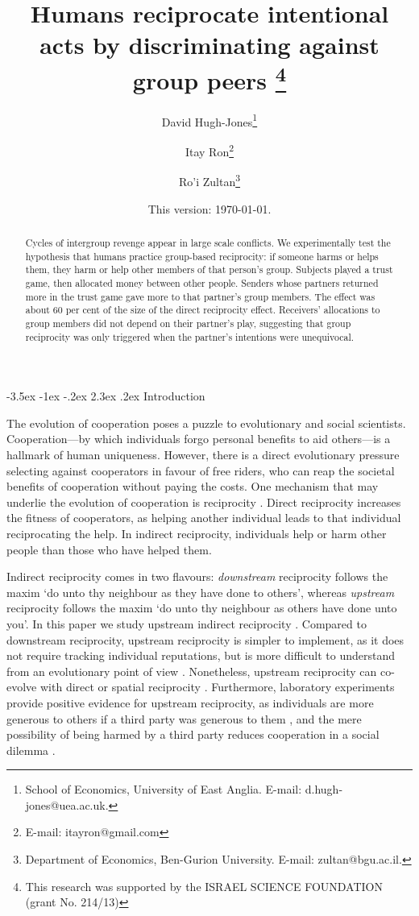 \documentclass[12pt,a4paper]{article}
\title{\bf\sffamily Humans reciprocate intentional acts by discriminating against group peers%
\thanks{
This research was supported by the ISRAEL SCIENCE FOUNDATION (grant No. 214/13)
}}
\author{David Hugh-Jones\thanks{School of Economics, University of East Anglia. E-mail: d.hugh-jones@uea.ac.uk.} \and Itay Ron\thanks{E-mail: itayron@gmail.com} \and Ro'i Zultan\thanks{Department of Economics, Ben-Gurion University. E-mail: zultan@bgu.ac.il.}}
\date{\sffamily \small This version: \today.}
\makeatletter
\renewcommand\section{\@startsection {section}{1}{\z@}%
{-3.5ex \@plus -1ex \@minus -.2ex}%
{2.3ex \@plus.2ex}%
{\bf\sffamily\Large}}
\makeatother
\begin{document}
\maketitle

\begin{abstract}
Cycles of intergroup revenge appear in large scale conflicts. We experimentally test the hypothesis that humans practice group-based reciprocity: if someone harms or helps them, they harm or help other members of that person's group. Subjects played a trust game, then allocated money between other people. Senders whose partners returned more in the trust game gave more to that partner's group members. The effect was about 60 per cent of the size of the direct reciprocity effect. Receivers' allocations to group members did not depend on their partner's play, suggesting that group reciprocity was only triggered when the partner's intentions were unequivocal.
\end{abstract}

\section{Introduction}

The evolution of cooperation poses a puzzle to evolutionary and social
scientists. Coope\-ration---by which individuals forgo personal benefits
to aid others---is a hallmark of human uniqueness. However, there
is a direct evolutionary pressure selecting against cooperators in
favour of free riders, who can reap the societal benefits of cooperation
without paying the costs. One mechanism that may underlie the evolution
of cooperation is reciprocity \citep{nowak2006five,nowak2012evolving}.
Direct reciprocity increases the fitness of cooperators, as helping
another individual leads to that individual reciprocating the help.
In indirect reciprocity, individuals help or harm other people than
those who have helped them.

Indirect reciprocity comes in two flavours: \emph{downstream} reciprocity
follows the maxim `do unto thy neighbour as they have done to others',
whereas \emph{upstream} reciprocity follows the maxim `do unto thy
neighbour as others have done unto you'. In this paper we study upstream
indirect reciprocity \citep{boyd1989evolution,nowak2005evolution,nowak2007upstream}.
Compared to downstream reciprocity, upstream reciprocity is simpler
to implement, as it does not require tracking individual reputations,
but is more difficult to understand from an evolutionary point of
view \citep{boyd1989evolution,nowak2005evolution}. Nonetheless, upstream
reciprocity can co-evolve with direct or spatial reciprocity \citep{nowak2007upstream}.
Furthermore, laboratory experiments provide positive evidence for
upstream reciprocity, as individuals are more generous to others if
a third party was generous to them \citep{dufwenberg2001direct,guth2001trust,greiner2005indirect},
and the mere possibility of being harmed by a third party reduces
cooperation in a social dilemma \citep{weisel2016social}. 
\end{document}
